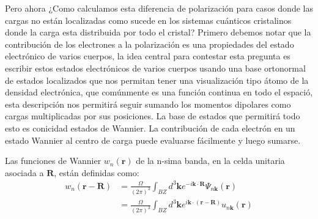 Pero ahora ¿Como calculamos esta diferencia de polarización para casos donde las cargas no están localizadas como sucede en los sistemas cuánticos cristalinos donde la carga esta distribuida por todo el cristal? Primero debemos notar que la contribución de los electrones a la polarización es una propiedades del estado electrónico de varios cuerpos, la idea central para contestar esta pregunta es escribir estos estados electrónicos de varios cuerpos usando una base ortonormal  de estados localizados que nos permitan tener una visualización tipo átomo de la densidad electrónica, que comúnmente es una función continua en todo el espació, esta descripción nos permitirá seguir sumando los momentos dipolares como cargas multiplicadas por sus posiciones. La base de estados que permitirá todo esto es conicidad estados de Wannier. La contribución de cada electrón en un estado Wannier al centro de carga puede evaluarse fácilmente y luego sumarse.

Las funciones de Wannier $w_n(\textbf{r})$ de la n-sima banda, en la celda unitaria asociada a $\textbf{R}$, están definidas como:
\begin{equation}
\begin{split}
     w_n(\textbf{r} - \textbf{R}) &= \frac{\Omega}{(2\pi)^3} \int_{BZ} d^3\textbf{k} e^{-i \textbf{k} \cdot \textbf{R}} \Psi_{n\textbf{k}}(\textbf{r})\\
     &= \frac{\Omega}{(2\pi)^3} \int_{BZ} d^3\textbf{k} e^{i \textbf{k} \cdot (\textbf{r} - \textbf{R})} u_{n\textbf{k}}(\textbf{r})
\end{split}
\end{equation}

